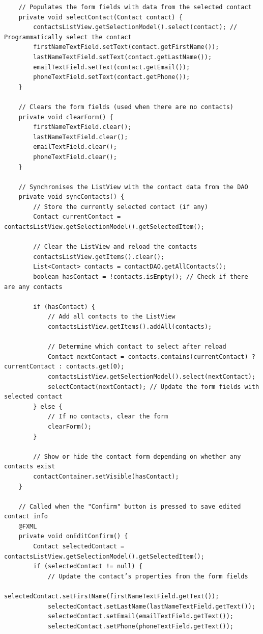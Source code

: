 \documentclass{article}
\begin{document}
\begin{verbatim}
    // Populates the form fields with data from the selected contact
    private void selectContact(Contact contact) {
        contactsListView.getSelectionModel().select(contact); // Programmatically select the contact
        firstNameTextField.setText(contact.getFirstName());
        lastNameTextField.setText(contact.getLastName());
        emailTextField.setText(contact.getEmail());
        phoneTextField.setText(contact.getPhone());
    }

    // Clears the form fields (used when there are no contacts)
    private void clearForm() {
        firstNameTextField.clear();
        lastNameTextField.clear();
        emailTextField.clear();
        phoneTextField.clear();
    }

    // Synchronises the ListView with the contact data from the DAO
    private void syncContacts() {
        // Store the currently selected contact (if any)
        Contact currentContact = contactsListView.getSelectionModel().getSelectedItem();

        // Clear the ListView and reload the contacts
        contactsListView.getItems().clear();
        List<Contact> contacts = contactDAO.getAllContacts();
        boolean hasContact = !contacts.isEmpty(); // Check if there are any contacts

        if (hasContact) {
            // Add all contacts to the ListView
            contactsListView.getItems().addAll(contacts);

            // Determine which contact to select after reload
            Contact nextContact = contacts.contains(currentContact) ? currentContact : contacts.get(0);
            contactsListView.getSelectionModel().select(nextContact);
            selectContact(nextContact); // Update the form fields with selected contact
        } else {
            // If no contacts, clear the form
            clearForm();
        }

        // Show or hide the contact form depending on whether any contacts exist
        contactContainer.setVisible(hasContact);
    }

    // Called when the "Confirm" button is pressed to save edited contact info
    @FXML
    private void onEditConfirm() {
        Contact selectedContact = contactsListView.getSelectionModel().getSelectedItem();
        if (selectedContact != null) {
            // Update the contact’s properties from the form fields
            selectedContact.setFirstName(firstNameTextField.getText());
            selectedContact.setLastName(lastNameTextField.getText());
            selectedContact.setEmail(emailTextField.getText());
            selectedContact.setPhone(phoneTextField.getText());


\end{verbatim}
\end{document}
